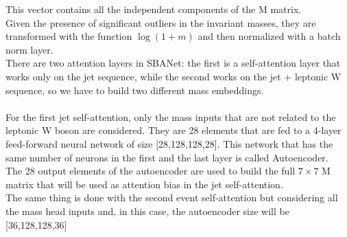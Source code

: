 This vector contains all the independent components of the M matrix.\\
Given the presence of significant outliers in the invariant masses, they are transformed with the function $\log(1+m)$ and then normalized with a batch norm layer.\\
There are two attention layers in SBANet: the first is a self-attention layer that works only on the jet sequence, while the second works on the jet + leptonic W sequence, so we have to build two different mass embeddings.\\
\\
For the first jet self-attention, only the mass inputs that are not related to the leptonic W boson are considered. They are 28 elements that are fed to a 4-layer feed-forward neural network of size [28,128,128,28]. This network that has the same number of neurons in the first and the last layer is called Autoencoder.\\
The 28 output elements of the autoencoder are used to build the full $7\times 7$ M matrix that will be used as attention bias in the jet self-attention.\\
The same thing is done with the second event self-attention but considering all the mass head inputs and, in this case, the autoencoder size will be [36,128,128,36]\\


